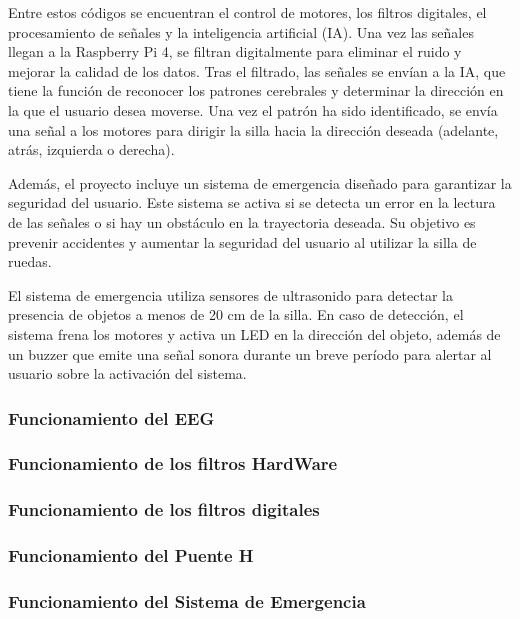 \documentclass{article}
\begin{document}
Entre estos códigos se encuentran el control de motores, los filtros digitales, el procesamiento de señales y la inteligencia artificial (IA). Una vez las señales llegan a la Raspberry Pi 4, se filtran digitalmente para eliminar el ruido y mejorar la calidad de los datos. Tras el filtrado, las señales se envían a la IA, que tiene la función de reconocer los patrones cerebrales y determinar la dirección en la que el usuario desea moverse. Una vez el patrón ha sido identificado, se envía una señal a los motores para dirigir la silla hacia la dirección deseada (adelante, atrás, izquierda o derecha).

Además, el proyecto incluye un sistema de emergencia diseñado para garantizar la seguridad del usuario. Este sistema se activa si se detecta un error en la lectura de las señales o si hay un obstáculo en la trayectoria deseada. Su objetivo es prevenir accidentes y aumentar la seguridad del usuario al utilizar la silla de ruedas.

El sistema de emergencia utiliza sensores de ultrasonido para detectar la presencia de objetos a menos de 20 cm de la silla. En caso de detección, el sistema frena los motores y activa un LED en la dirección del objeto, además de un buzzer que emite una señal sonora durante un breve período para alertar al usuario sobre la activación del sistema.

\subsubsection{Funcionamiento del EEG}


\subsubsection{Funcionamiento de los filtros HardWare}


\subsubsection{Funcionamiento de los filtros digitales}


\subsubsection{Funcionamiento del Puente H}


\subsubsection{Funcionamiento del Sistema de Emergencia}
\end{document}
